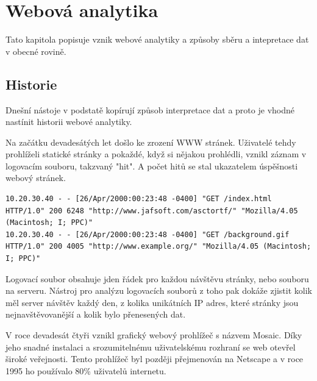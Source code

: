 \documentclass[bc,male,java,dept456]{diploma}						%
\begin{document}

\section{Webová analytika}

Tato kapitola popisuje vznik webové analytiky a způsoby sběru a intepretace dat v obecné rovině. 



\subsection{Historie}


Dnešní nástoje v podstatě kopírují způsob interpretace dat a proto je vhodné nastínit historii webové analytiky.

Na začátku devadesátých let došlo ke zrození WWW stránek. Uživatelé tehdy pro\-hlí\-želi statické stránky a pokaždé, když si nějakou prohlédli, vznikl záznam v logovacím souboru, takzvaný "hit". A počet hitů se stal ukazatelem úspěšnosti webový stránek.

\bigskip

\begin{lstlisting}[label=src:Plain,caption=Ukázka záznamu z logovacího souboru]
10.20.30.40 - - [26/Apr/2000:00:23:48 -0400] "GET /index.html HTTP/1.0" 200 6248 "http://www.jafsoft.com/asctortf/" "Mozilla/4.05 (Macintosh; I; PPC)"
10.20.30.40 - - [26/Apr/2000:00:23:48 -0400] "GET /background.gif HTTP/1.0" 200 4005 "http://www.example.org/" "Mozilla/4.05 (Macintosh; I; PPC)"
\end{lstlisting}

\bigskip

Logovací soubor obsahuje jden řádek pro každou návštěvu stránky, nebo souboru na serveru. Nástroj pro analýzu logovacích souborů z toho pak dokáže zjistit kolik měl server návštěv každý den, z kolika unikátních IP adres, které stránky jsou nej\-na\-vště\-vo\-va\-něj\-ší a kolik bylo přenesených dat.

V roce devadesát čtyři vznikl grafický webový prohlížeč s názvem Mosaic. Díky jeho snadné instalaci a srozumitelnému uživatelskému rozhraní se web otevřel široké veřejnosti. Tento prohlížeč byl později přejmenován na Netscape a v roce 1995 ho po\-u\-ží\-va\-lo 80\% uživatelů internetu.
\end{document}

